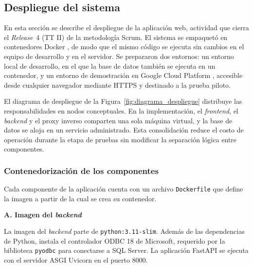 
\subsection{Despliegue del sistema}
\label{sec:despliegue}

En esta sección se describe el despliegue de la aplicación web, actividad que cierra el \textit{Release}~4 (TT II) de la metodología Scrum. El sistema se empaquetó en contenedores Docker \cite{dockerDocs}, de modo que el mismo código se ejecuta sin cambios en el equipo de desarrollo y en el servidor. Se prepararon dos entornos: un entorno local de desarrollo, en el que la base de datos también se ejecuta en un contenedor, y un entorno de demostración en Google Cloud Platform \cite{gcpComputeEngine}, accesible desde cualquier navegador mediante HTTPS y destinado a la prueba piloto.

El diagrama de despliegue de la Figura~\ref{fig:diagrama_despliegue} distribuye las responsabilidades en nodos conceptuales. En la implementación, el \textit{frontend}, el \textit{backend} y el proxy inverso comparten una sola máquina virtual, y la base de datos se aloja en un servicio administrado. Esta consolidación reduce el costo de operación durante la etapa de pruebas sin modificar la separación lógica entre componentes.

\subsubsection{Contenedorización de los componentes}

Cada componente de la aplicación cuenta con un archivo \texttt{Dockerfile} que define la imagen a partir de la cual se crea su contenedor.

\textbf{A. Imagen del \textit{backend}}

La imagen del \textit{backend} parte de \texttt{python:3.11-slim}. Además de las dependencias de Python, instala el controlador ODBC 18 de Microsoft, requerido por la biblioteca \texttt{pyodbc} para conectarse a SQL Server. La aplicación FastAPI \cite{fastapiDocs} se ejecuta con el servidor ASGI Uvicorn en el puerto 8000.

